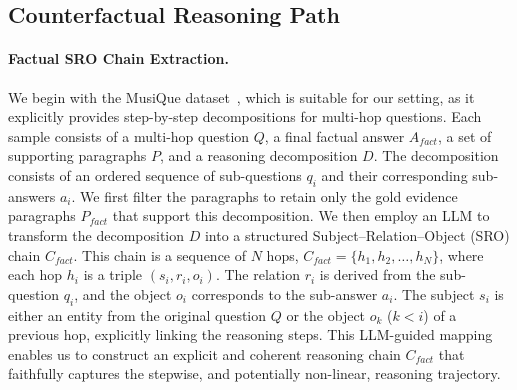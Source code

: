 \documentclass[10pt, a4paper]{article}
\begin{document}
\subsection{Counterfactual Reasoning Path}
\paragraph{Factual SRO Chain Extraction.} We begin with the MusiQue dataset~\cite{trivedi-etal-2022-musique}, which is suitable for our setting, as it explicitly provides step-by-step decompositions for multi-hop questions. Each sample consists of a multi-hop question $Q$, a final factual answer $A_{fact}$, a set of supporting paragraphs $P$, and a reasoning decomposition $D$. The decomposition consists of an ordered sequence of sub-questions $q_i$ and their corresponding sub-answers $a_i$. We first filter the paragraphs to retain only the gold evidence paragraphs $P_{fact}$ that support this decomposition. We then employ an LLM to transform the decomposition $D$ into a structured Subject--Relation--Object (SRO) chain $C_{fact}$. This chain is a sequence of $N$ hops, $C_{fact}=\{h_1, h_2, \ldots, h_N\}$, where each hop $h_i$ is a triple $(s_i, r_i, o_i)$. The relation $r_i$ is derived from the sub-question $q_i$, and the object $o_i$ corresponds to the sub-answer $a_i$. The subject $s_i$ is either an entity from the original question $Q$ or the object $o_k$ ($k<i$) of a previous hop, explicitly linking the reasoning steps. This LLM-guided mapping enables us to construct an explicit and coherent reasoning chain $C_{fact}$ that faithfully captures the stepwise, and potentially non-linear, reasoning trajectory.
\end{document}
